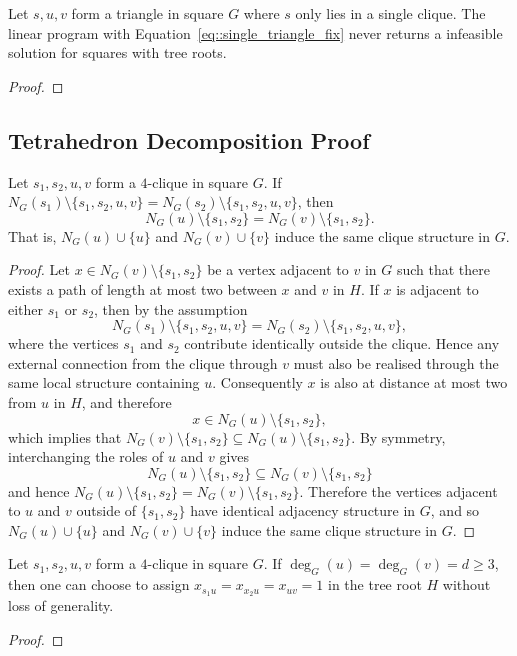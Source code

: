 \begin{proposition} \label{prop::single_triangular_decomposition_feasibility}
  Let $s,u,v$ form a triangle in square $G$ where $s$ only lies in a single clique. The linear program with Equation~\eqref{eq::single_triangle_fix} never returns a infeasible solution for squares with tree roots. 
\end{proposition}
\begin{proof}
\end{proof}

\subsection{Tetrahedron Decomposition Proof} \label{subsec::TD_proof}
\begin{lemma} \label{lemma::tetrahedron_subset_neighbourhood}
  Let $s_1,s_2,u,v$ form a $4$-clique in square $G$. If $N_G(s_1)\setminus\{s_1,s_2,u,v\}=N_G(s_2)\setminus\{s_1,s_2,u,v\}$, then
  \[
  N_G(u)\setminus\{s_1, s_2\}=N_G(v)\setminus\{s_1, s_2\}.
  \]
  That is, $N_G(u)\cup\{u\}$ and $N_G(v)\cup\{v\}$ induce the same clique structure in $G$.
\end{lemma}
\begin{proof}
  Let $x \in N_G(v)\setminus\{s_1,s_2\}$ be a vertex adjacent to $v$ in $G$ such that there exists a path of length at most two between $x$ and $v$ in $H$. If $x$ is adjacent to either $s_1$ or $s_2$, then by the assumption
  \[
  N_G(s_1)\setminus\{s_1,s_2,u,v\}
  =
  N_G(s_2)\setminus\{s_1,s_2,u,v\},
  \]
  where the vertices $s_1$ and $s_2$ contribute identically outside the clique. Hence any external connection from the clique through $v$ must also be realised through the same local structure containing $u$. Consequently $x$ is also at distance at most two from $u$ in $H$, and therefore
  \[
  x\in N_G(u)\setminus\{s_1,s_2\},
  \]
  which implies that $N_G(v)\setminus\{s_1,s_2\} \subseteq N_G(u)\setminus\{s_1,s_2\}$. By symmetry, interchanging the roles of $u$ and $v$ gives
  \[
  N_G(u)\setminus\{s_1,s_2\} \subseteq N_G(v)\setminus\{s_1,s_2\} 
  \]
  and hence  $N_G(u)\setminus\{s_1,s_2\} = N_G(v)\setminus\{s_1,s_2\}$. Therefore the vertices adjacent to $u$ and $v$ outside of $\{s_1,s_2\}$ have identical adjacency structure in $G$, and so $N_G(u)\cup\{u\}$ and $N_G(v)\cup\{v\}$ induce the same clique structure in $G$.
\end{proof}

\begin{proposition} \label{prop::textrahedron_decomposition_equality}
  Let $s_1,s_2,u,v$ form a $4$-clique in square $G$. If $\deg_G(u)=\deg_G(v)=d\geq3$, then one can choose to assign $x_{s_1u}=x_{x_2u}=x_{uv}=1$ in the tree root $H$ without loss of generality.
\end{proposition}
\begin{proof}
  
\end{proof}

